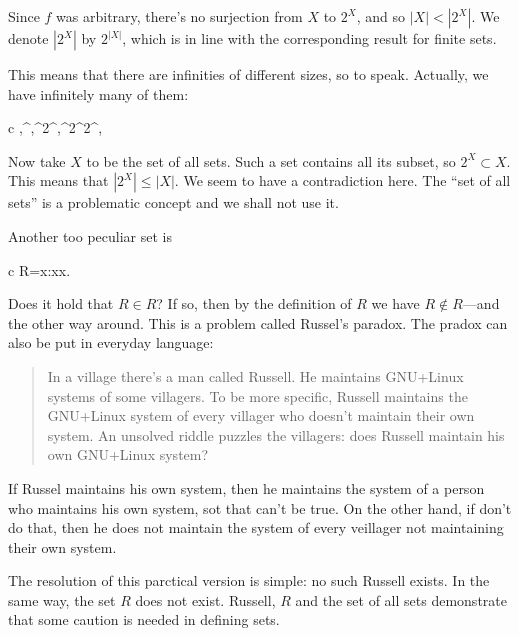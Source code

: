 \documentclass[11pt,oneside,%
]{memoir}
\newenvironment{eqna}{\begin{IEEEeqnarray}{c}}{\end{IEEEeqnarray}\ignorespacesafterend}
\theoremstyle{definition}
\newcommand{\NN}{\mathbb{N}}
\begin{document}
Since \(f\) was arbitrary, there's no surjection from \(X\) to \(2^X\), and so \(|X|<|2^X|\). We denote \(|2^X|\) by \(2^{|X|}\), which is in line with the corresponding result for finite sets.

This means that there are infinities of different sizes, so to speak. Actually, we have infinitely many of them:
\begin{eqna}
    \NN,^\NN,^{2^\NN},^{2^{2^\NN}},\: \dotsc
\end{eqna}

Now take \(X\) to be the set of all sets. Such a set contains all its subset, so \(2^X\subset X\). This means that \(|2^X|\leq|X|\). We seem to have a contradiction here. The ``set of all sets'' is a problematic concept and we shall not use it.

Another too peculiar set is
\begin{eqna}
    R=\lbrace x:x\notin x\rbrace.
\end{eqna}
Does it hold that \(R\in R\)? If so, then by the definition of \(R\) we have \(R\notin R\)---and the other way around. This is a problem called Russel's paradox. The pradox can also be put in everyday language:
\begin{quote}
    In a village there's a man called Russell. He maintains GNU+Linux systems of some villagers. To be more specific, Russell maintains the GNU+Linux system of every villager who doesn't maintain their own system. An unsolved riddle puzzles the villagers: does Russell maintain his own GNU+Linux system?
\end{quote}
If Russel maintains his own system, then he maintains the system of a person who maintains his own system, sot that can't be true. On the other hand, if don't do that, then he does not maintain the system of every veillager not maintaining their own system.

The resolution of this parctical version is simple: no such Russell exists. In the same way, the set \(R\) does not exist. Russell, \(R\) and the set of all sets demonstrate that some caution is needed in defining sets.
\end{document}
